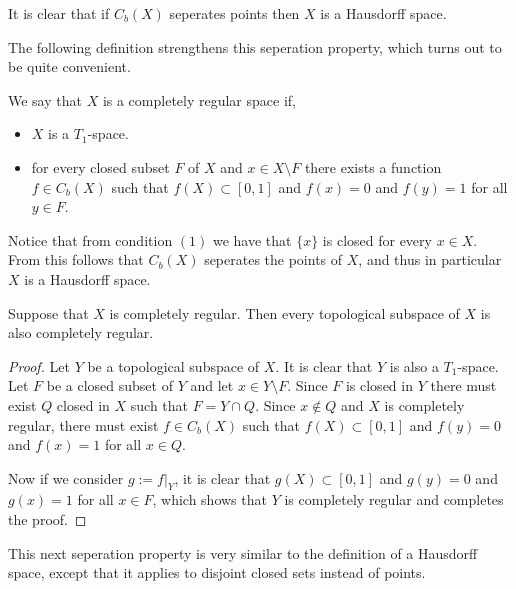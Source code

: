 \documentclass[11pt,a4paper]{article}
\begin{document}
\begin{remark}
  It is clear that if $C_b(X)$ seperates points then $X$ is a Hausdorff
  space.
\end{remark}

\begin{remark}
  The following definition strengthens this seperation property, which
  turns out to be quite convenient.
\end{remark}

\begin{definition}
    We say that $X$ is a completely regular space if,
    \begin{itemize}
      \item[(1)] $X$ is a $T_1$-space.
      \item[(2)] for every closed subset $F$ of $X$ and $x \in X \setminus F$
        there exists a function $f \in C_b(X)$ such that $f(X) \subset [0,1]$ 
        and $f(x) = 0$ and $f(y) = 1$ for all $y \in F$.
    \end{itemize}
\end{definition}

\begin{remark}
  Notice that from condition $(1)$ we have that $\{x\}$ is closed for every
  $x \in X$. From this follows that $C_b(X)$ seperates the points of $X$,
  and thus in particular $X$ is a Hausdorff space.
\end{remark}

\begin{proposition}
  Suppose that $X$ is completely regular. Then every topological subspace
  of $X$ is also completely regular.
\end{proposition}
\begin{proof}
  Let $Y$ be a topological subspace of $X$. It is clear that $Y$ is also
  a $T_1$-space. Let $F$ be a closed subset of $Y$ and let 
  $x \in Y \setminus F$. Since $F$ is closed in $Y$ there must exist
  $Q$ closed in $X$ such that $F = Y \cap Q$. Since $x \notin Q$ and
  $X$ is completely regular, there must exist $f \in C_b(X)$ such that
  $f(X) \subset [0,1]$ and $f(y) = 0$ and $f(x) = 1$ for all $x \in Q$.
  
  Now if we consider $g := f\vert_Y$, it is clear that
  $g(X) \subset [0,1]$ and $g(y) = 0$ and $g(x) = 1$ for all $x \in F$,
  which shows that $Y$ is completely regular and completes the proof.
\end{proof}

This next seperation property is very similar to the definition of a
Hausdorff space, except that it applies to disjoint closed sets instead
of points.
\end{document}
